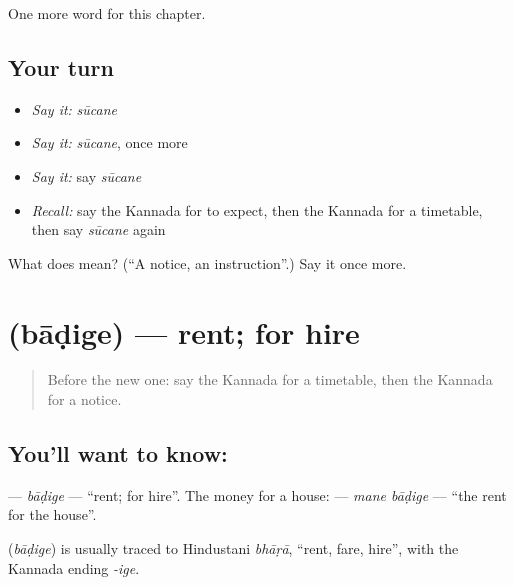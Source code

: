 \begin{grammarlens}[title={What you've built}]
One more word for this chapter.
\end{grammarlens}

\subsection*{Your turn}
\begin{itemize}
\raggedright
  \item \emph{Say it:} \emph{sūcane}
  \item \emph{Say it:} \emph{sūcane}, once more
  \item \emph{Say it:} say \emph{sūcane}
  \item \emph{Recall:} say the Kannada for to expect, then the Kannada for a timetable, then say \emph{sūcane} again
\end{itemize}

\begin{tcolorbox}[breakable,colback=teal!4,colframe=teal!35!black,title={Before you move on}]
What does  mean? (\textquotedblleft{}A notice, an instruction\textquotedblright{}.) Say it once more.
\end{tcolorbox}
\section[\texorpdfstring{\kn{ಬಾಡಿಗೆ} (bāḍige)}{ಬಾಡಿಗೆ (bāḍige)}]{ (bāḍige) — rent; for hire}

\label{lesson:KA-C157-badige}



\begin{quote}
Before the new one: say the Kannada for a timetable, then the Kannada for a notice.
\end{quote}

\subsection*{You'll want to know: }
\textbf{} — \emph{bāḍige} — \textquotedblleft{}rent; for hire\textquotedblright{}. The money for a house: \textbf{ } — \emph{mane bāḍige} — \textquotedblleft{}the rent for the house\textquotedblright{}.

\begin{cousinweb}
\textbf{} (\emph{bāḍige}) is usually traced to Hindustani \emph{bhāṛā}, \textquotedblleft{}rent, fare, hire\textquotedblright{}, with the Kannada ending \emph{-ige}.
\end{cousinweb}

